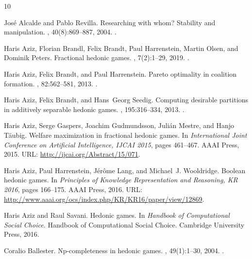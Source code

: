 \documentclass[a4paper]{article}
\begin{document}
\begin{thebibliography}{10}

Jos{\'e} Alcalde and Pablo Revilla.
\newblock Researching with whom? {S}tability and manipulation.
, 40(8):869--887, 2004.
\newblock \href {https://doi.org/10.1016/j.jmateco.2003.12.001} {}.

Haris Aziz, Florian Brandl, Felix Brandt, Paul Harrenstein, Martin Olsen, and Dominik Peters.
\newblock Fractional hedonic games.
, 7(2):1--29, 2019.
\newblock \href {https://doi.org/10.1145/3327970} {}.

Haris Aziz, Felix Brandt, and Paul Harrenstein.
\newblock Pareto optimality in coalition formation.
, 82:562--581, 2013.
\newblock \href {https://doi.org/10.1016/j.geb.2013.08.006} {}.

Haris Aziz, Felix Brandt, and Hans~Georg Seedig.
\newblock Computing desirable partitions in additively separable hedonic games.
, 195:316--334, 2013.
\newblock \href {https://doi.org/10.1016/J.ARTINT.2012.09.006} {}.

Haris Aziz, Serge Gaspers, Joachim Gudmundsson, Juli{\'{a}}n Mestre, and Hanjo T{\"{a}}ubig.
\newblock Welfare maximization in fractional hedonic games.
\newblock In {\em International Joint Conference on Artificial Intelligence, {IJCAI} 2015}, pages 461--467. {AAAI} Press, 2015.
\newblock URL: \url{http://ijcai.org/Abstract/15/071}.

Haris Aziz, Paul Harrenstein, J{\'{e}}r{\^{o}}me Lang, and Michael~J. Wooldridge.
\newblock Boolean hedonic games.
\newblock In {\em Principles of Knowledge Representation and Reasoning, {KR} 2016}, pages 166--175. {AAAI} Press, 2016.
\newblock URL: \url{http://www.aaai.org/ocs/index.php/KR/KR16/paper/view/12869}.

Haris Aziz and Raul Savani.
\newblock Hedonic games.
\newblock In {\em Handbook of Computational Social Choice.} Handbook of Computational Social Choice. Cambridge University Press, 2016.

Coralio Ballester.
\newblock Np-completeness in hedonic games.
, 49(1):1--30, 2004.
\newblock \href {https://doi.org/10.1016/j.geb.2003.10.003} {}.


\end{thebibliography}
\end{document}

